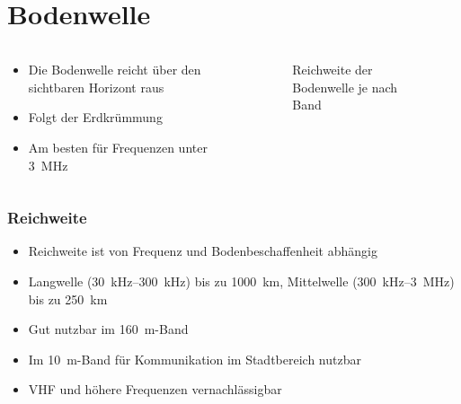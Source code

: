
\section{Bodenwelle}
\label{section:bodenwelle}
\begin{frame}%

\begin{columns}
    \begin{column}{0.48\textwidth}
    \begin{itemize}
  \item Die Bodenwelle reicht über den sichtbaren Horizont raus
  \item Folgt der Erdkrümmung
  \item Am besten für Frequenzen unter \qty{3}{\mega\hertz}
  \end{itemize}

    \end{column}
   \begin{column}{0.48\textwidth}
       
\begin{figure}
    \caption{\scriptsize Reichweite der Bodenwelle je nach Band}
    \label{e_reichweite_bodenwelle}
\end{figure}


   \end{column}
\end{columns}

\end{frame}

\begin{frame}
\frametitle{Reichweite}
\begin{itemize}
  \item Reichweite ist von Frequenz und Bodenbeschaffenheit abhängig
  \item Langwelle (\qty{30}{\kilo\hertz}–\qty{300}{\kilo\hertz}) bis zu \qty{1000}{\kilo\metre}, Mittelwelle (\qty{300}{\kilo\hertz}–\qty{3}{\mega\hertz}) bis zu \qty{250}{\kilo\metre}
  \item Gut nutzbar im \qty{160}{\metre}-Band
  \item Im \qty{10}{\metre}-Band für Kommunikation im Stadtbereich nutzbar
  \item VHF und höhere Frequenzen vernachlässigbar
  \end{itemize}

\end{frame}


